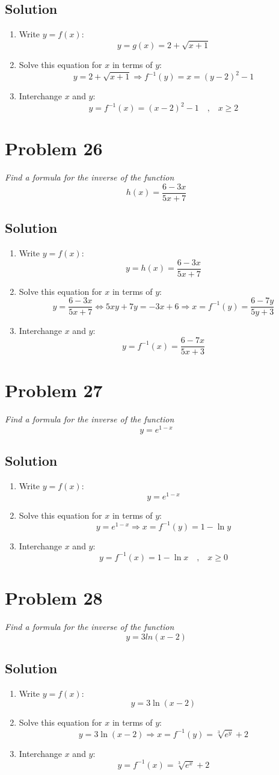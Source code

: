 \documentclass[11pt]{article}
\newcommand{\soln}{\subsection*}
\newcommand{\qn}{\textit}
\newcommand{\eqtext}[1]{\quad\text{#1}\quad}
\begin{document}
\soln{Solution}
\begin{enumerate}
	\item Write $y=f(x)$: $$y=g(x)=2+\sqrt{x+1}$$
	\item Solve this equation for $x$ in terms of $y$: $$y=2+\sqrt{x+1} \Rightarrow f^{-1}(y)=x=(y-2)^2-1$$
	\item Interchange $x$ and $y$: $$y=f^{-1}(x)=(x-2)^2-1 \eqtext{,} x \ge 2$$
\end{enumerate}

\section*{Problem 26}

\qn{Find a formula for the inverse of the function $$h(x)=\frac{6-3x}{5x+7}$$}

\soln{Solution}
\begin{enumerate}
	\item Write $y=f(x)$: $$y=h(x)=\frac{6-3x}{5x+7}$$
	\item Solve this equation for $x$ in terms of $y$: $$y=\frac{6-3x}{5x+7} \Leftrightarrow 5xy+7y=-3x+6 \Rightarrow x=f^{-1}(y)=\frac{6-7y}{5y+3}$$
	\item Interchange $x$ and $y$: $$y=f^{-1}(x)=\frac{6-7x}{5x+3}$$
\end{enumerate}

\section*{Problem 27}

\qn{Find a formula for the inverse of the function $$y=e^{1-x}$$}

\soln{Solution}
\begin{enumerate}
	\item Write $y=f(x)$: $$y=e^{1-x}$$
	\item Solve this equation for $x$ in terms of $y$: $$y=e^{1-x} \Rightarrow x=f^{-1}(y)=1-\ln{y}$$
	\item Interchange $x$ and $y$: $$y=f^{-1}(x)=1-\ln{x} \eqtext{,} x \ge 0$$
\end{enumerate}

\section*{Problem 28}

\qn{Find a formula for the inverse of the function $$y=3ln(x-2)$$}

\soln{Solution}
\begin{enumerate}
	\item Write $y=f(x)$: $$y=3\ln(x-2)$$
	\item Solve this equation for $x$ in terms of $y$: $$y=3\ln(x-2) \Rightarrow x=f^{-1}(y)=\sqrt[3]{e^y}+2$$
	\item Interchange $x$ and $y$: $$y=f^{-1}(x)=\sqrt[3]{e^x}+2$$
\end{enumerate}
\end{document}
